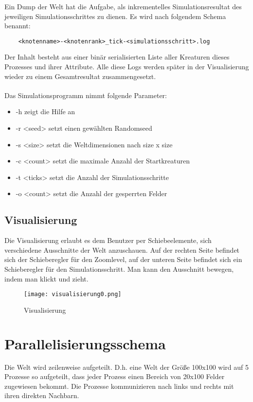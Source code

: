 \documentclass[a4paper,12pt]{article}
\begin{document}
Ein Dump der Welt hat die Aufgabe, als inkrementelles Simulationsresultat
des jeweiligen Simulationsschrittes zu dienen. Es wird nach folgendem Schema
benannt:
\begin{verbatim}
	<knotenname>-<knotenrank>_tick-<simulationsschritt>.log
\end{verbatim}
Der Inhalt besteht aus einer binär serialisierten Liste aller Kreaturen dieses
Prozesses und ihrer Attribute. Alle diese Logs werden später in der
Visualisierung wieder zu einem Gesamtresultat zusammengesetzt.
\\\\
Das Simulationsprogramm nimmt folgende Parameter:
\begin{itemize}
	\item -h zeigt die Hilfe an
	\item -r <seed> setzt einen gewählten Randomseed
	\item -s <size> setzt die Weltdimensionen nach size x size
	\item -c <count> setzt die maximale Anzahl der Startkreaturen
	\item -t <ticks> setzt die Anzahl der Simulationsschritte
	\item -o <count> setzt die Anzahl der gesperrten Felder 
\end{itemize}

\subsection{Visualisierung}
Die Visualisierung erlaubt es dem Benutzer per Schiebeelemente, sich
verschiedene Ausschnitte der Welt anzuschauen. Auf der rechten Seite
befindet sich der Schieberegler für den Zoomlevel, auf der unteren Seite
befindet sich ein Schieberegler für den Simulationsschritt. Man kann den
Ausschnitt bewegen, indem man klickt und zieht.
\begin{figure}[H]
	\centerline{\texttt{[image: visualisierung0.png]}}
	\caption{Visualisierung}
\end{figure}

\section{Parallelisierungsschema}
Die Welt wird zeilenweise aufgeteilt. D.h. eine Welt der Größe 100x100 wird
auf 5 Prozesse so aufgeteilt, dass jeder Prozess einen Bereich von 20x100 Felder
zugewiesen bekommt. Die Prozesse kommunizieren nach links und rechts mit ihren
direkten Nachbarn.
\end{document}
